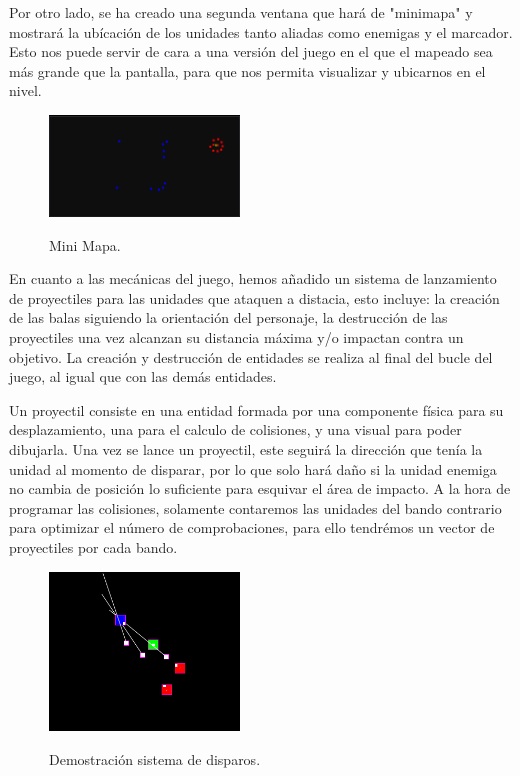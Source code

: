 Por otro lado, se ha creado una segunda ventana que hará de "minimapa" y mostrará la ubícación de los unidades
tanto aliadas como enemigas y el marcador. Esto nos puede servir de cara a una versión del juego en el que el
mapeado sea más grande que la pantalla, para que nos permita visualizar y ubicarnos en el nivel.

\begin{figure}[htb]
\centering
\includegraphics[width=0.45\textwidth]{imagenes/diario_desarrollo/minimap.png}\\
\caption{Mini Mapa.}
\label{fig:minimap}
\end{figure}

En cuanto a las mecánicas del juego, hemos añadido un sistema de lanzamiento de proyectiles para las unidades
que ataquen a distacia, esto incluye: la creación de las balas siguiendo la orientación del personaje, la
destrucción de las proyectiles una vez alcanzan su distancia máxima y/o impactan contra un objetivo.
La creación y destrucción de entidades se realiza al final del bucle del juego, al igual que con las
demás entidades. 

Un proyectil consiste en una entidad formada por una componente física para su desplazamiento, una para el
calculo de colisiones, y una visual para poder dibujarla. Una vez se lance un proyectil, este seguirá la
dirección que tenía la unidad al momento de disparar, por lo que solo hará daño si la unidad enemiga no 
cambia de posición lo suficiente para esquivar el área de impacto. A la hora de programar las colisiones,
solamente contaremos las unidades del bando contrario para optimizar el número de comprobaciones, para ello
tendrémos un vector de proyectiles por cada bando.

\begin{figure}[htb]
\centering
\includegraphics[width=0.45\textwidth]{imagenes/diario_desarrollo/balas.png}\\
\caption{Demostración sistema de disparos.}
\label{fig:balas}
\end{figure}


